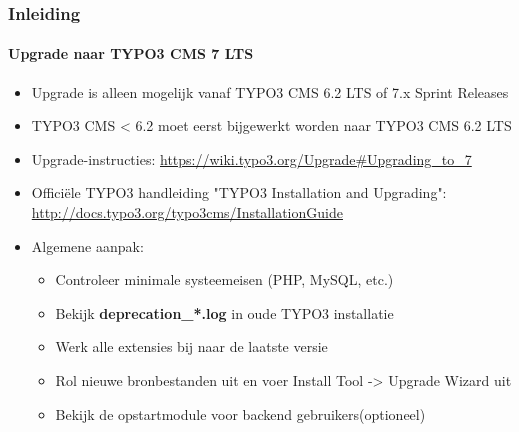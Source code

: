 \begin{frame}[fragile]
	\frametitle{Inleiding}
	\framesubtitle{Upgrade naar TYPO3 CMS 7 LTS}

	\begin{itemize}
		\item Upgrade is alleen mogelijk vanaf TYPO3 CMS 6.2 LTS of 7.x Sprint Releases
		\item TYPO3 CMS < 6.2 moet eerst bijgewerkt worden naar TYPO3 CMS 6.2 LTS
	\end{itemize}

	\begin{itemize}

		\item Upgrade-instructies:\newline
			\smaller\url{https://wiki.typo3.org/Upgrade#Upgrading_to_7}\normalsize
		\item Officiële TYPO3 handleiding "TYPO3 Installation and Upgrading":
			\smaller\url{http://docs.typo3.org/typo3cms/InstallationGuide}\normalsize
		\item Algemene aanpak:
			\begin{itemize}
				\item Controleer minimale systeemeisen \small(PHP, MySQL, etc.)
				\item Bekijk \textbf{deprecation\_*.log} in oude TYPO3 installatie
				\item Werk alle extensies bij naar de laatste versie
				\item Rol nieuwe bronbestanden uit en voer Install Tool -> Upgrade Wizard uit
				\item Bekijk de opstartmodule voor backend gebruikers(optioneel)
			\end{itemize}
	\end{itemize}

\end{frame}

